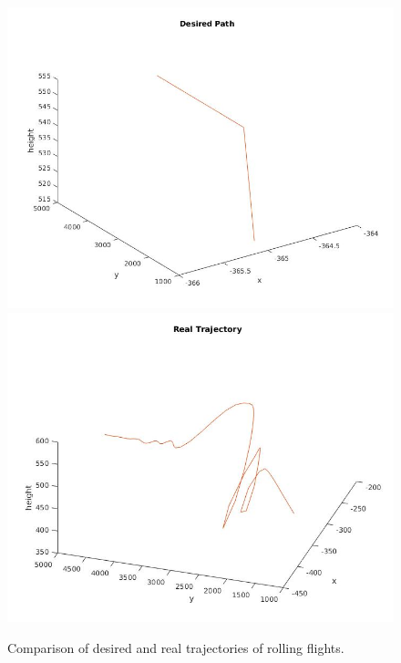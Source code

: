 \documentclass[11pt,a4paper]{scrartcl}		%
\begin{document}
\begin{figure}[!h]
  \centering
  	\includegraphics[width=13cm]{pictures/Results/roll-desired.jpg}
  	\includegraphics[width=13cm]{pictures/Results/roll-real.jpg}
  \caption{Comparison of desired and real trajectories of rolling flights.}
  \label{fig_roll}
\end{figure}		


\FloatBarrier


\newpage
\end{document}
